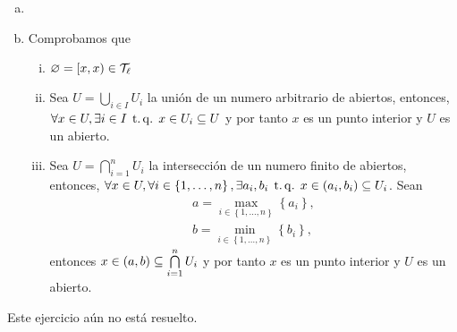 \begin{eje}
    \begin{enumerate}[(a)]
        \item[]
        \item Comprobamos que
            \begin{enumerate}[i)]
                \item $\varnothing = \left[ x, x \right) \in \mathcal{T}_\ell$
                \item Sea $U = \bigcup\limits_{i \in I} U_i$ la unión de un numero arbitrario de abiertos, entonces, $\forall x \in U, \exists i \in I \operatorname{\;t.q.\;} x \in U_i \subseteq U$ y por tanto $x$ es un punto interior y $U$ es un abierto.
                \item Sea $U = \bigcap\limits_{i = 1}^n U_i$ la intersección de un numero finito de abiertos, entonces, $\forall x \in U, \forall i \in \left\{ 1, \dots, n \right\}, \exists a_i, b_i \operatorname{\;t.q.\;} x \in \left(a_i, b_i\right) \subseteq U_i$. Sean
                    \begin{gather*}
                        a = \max_{i \in \left\{ 1, \dots, n \right\}} \left\{a_i\right\}, \\
                        b = \min_{i \in \left\{ 1, \dots, n \right\}} \left\{b_i\right\},
                    \end{gather*}
                entonces $x \in \left( a, b \right) \subseteq \bigcap\limits_{i = 1}^n U_i$ y por tanto $x$ es un punto interior y $U$ es un abierto.
            \end{enumerate}
    \end{enumerate}
\end{eje}

\begin{eje}
 Este ejercicio aún no está resuelto.
\end{eje}

